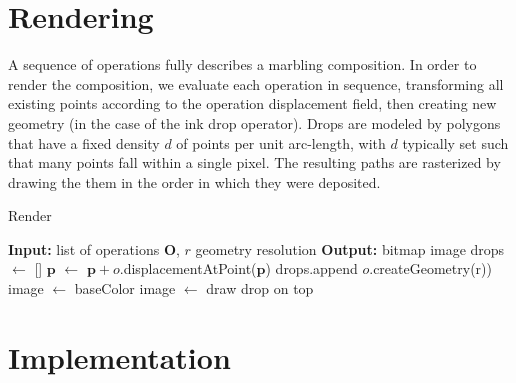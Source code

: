 \documentclass{article}
\begin{document}

\section{Rendering}

A sequence of operations fully describes a marbling composition. In order to render the composition, we evaluate each operation in sequence, transforming all existing points according to the operation displacement field, then creating new geometry (in the case of the ink drop operator). Drops are modeled by polygons that have a fixed density $d$ of points per unit arc-length, with $d$ typically set such that many points fall within a single pixel. The resulting paths are rasterized by drawing the them in the order in which they were deposited.

\begin{algorithm}
	\caption{Render}
	\label{alg:update}

	\begin{algorithmic}[1] %
			
		\State \textbf{Input:}  list of operations $\bm{O}$, $r$ geometry resolution
		\State \textbf{Output:}  bitmap image
		\State drops $\gets$ []
		 {}
                    \State $\bm{p}$ $\gets$ $\bm{p} + o$.displacementAtPoint($\bm{p}$)
                \EndFor
            \EndFor
                        \State drops.append $o$.createGeometry(r))
                   \EndIf
        \EndFor
        \State image $\gets$ baseColor
            \State image $\gets$ draw drop on top
        \EndFor
		
		\EndProcedure
	\end{algorithmic}
\end{algorithm}

\section{Implementation}
\end{document}

